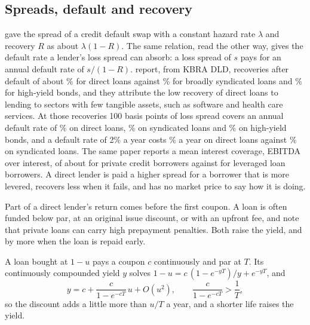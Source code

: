 \begin{chapterrefs}
\subsection{Spreads, default and recovery}

 gave the spread of a credit default swap with a constant hazard rate $\lambda$ and
recovery $R$ as about $\lambda(1-R)$. The same relation, read the other way, gives the default rate a
lender's loss spread can absorb: a loss spread of $s$ pays for an annual default rate of $s/(1-R)$.
\textcite{cai2024} report, from KBRA DLD, recoveries after default of about \dlRecDirect\% for direct
loans against \dlRecSynd\% for broadly syndicated loans and \dlRecHy\% for high-yield bonds, and they
attribute the low recovery of direct loans to lending to sectors with few tangible assets, such as
software and health care services.  At those recoveries 100 basis points of loss spread
covers an annual default rate of \dlPdPerDirect\% on direct loans, \dlPdPerSynd\% on syndicated loans
and \dlPdPerHy\% on high-yield bonds, and a default rate of 2\% a year costs \dlLossDirectTwo\% a year on
direct loans against \dlLossSyndTwo\% on syndicated loans. The same paper reports a mean interest
coverage, EBITDA over interest, of about \dlIcrPrivate{} for private credit borrowers against
\dlIcrLev{} for leveraged loan borrowers. A direct lender is paid a higher spread for a borrower that is
more levered, recovers less when it fails, and has no market price to say how it is doing.

Part of a direct lender's return comes before the first coupon. A loan is often funded below par, at
an original issue discount, or with an upfront fee, and \textcite{cai2024} note that private loans can
carry high prepayment penalties. Both raise the yield, and by more when the loan is repaid early.

\begin{proposition}\label{prop6:oid}
A loan bought at $1-u$ pays a coupon $c$ continuously and par at $T$. Its continuously compounded yield
$y$ solves $1-u=c\,(1-e^{-yT})/y+e^{-yT}$, and
\[
  y=c+\frac{c}{1-e^{-cT}}\,u+O(u^2),\qquad \frac{c}{1-e^{-cT}}>\frac1T ,
\]
so the discount adds a little more than $u/T$ a year, and a shorter life raises the yield.
\end{proposition}


\end{chapterrefs}
